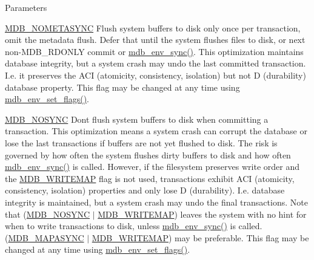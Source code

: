 \begin{DoxyParams}[1]{Parameters}
\begin{DoxyItemize}
\item \mbox{\hyperlink{group__mdb__env_ga5021c4e96ffe9f383f5b8ab2af8e4b16}{M\+D\+B\+\_\+\+N\+O\+M\+E\+T\+A\+S\+Y\+NC}} Flush system buffers to disk only once per transaction, omit the metadata flush. Defer that until the system flushes files to disk, or next non-\/\+M\+D\+B\+\_\+\+R\+D\+O\+N\+LY commit or \mbox{\hyperlink{group__mdb_ga85e61f05aa68b520cc6c3b981dba5037}{mdb\+\_\+env\+\_\+sync()}}. This optimization maintains database integrity, but a system crash may undo the last committed transaction. I.\+e. it preserves the A\+CI (atomicity, consistency, isolation) but not D (durability) database property. This flag may be changed at any time using \mbox{\hyperlink{group__mdb_ga83f66cf02bfd42119451e9468dc58445}{mdb\+\_\+env\+\_\+set\+\_\+flags()}}. 
\item \mbox{\hyperlink{group__mdb__env_ga5791dd1adb09123f82dd1f331209e12e}{M\+D\+B\+\_\+\+N\+O\+S\+Y\+NC}} Don\textquotesingle{}t flush system buffers to disk when committing a transaction. This optimization means a system crash can corrupt the database or lose the last transactions if buffers are not yet flushed to disk. The risk is governed by how often the system flushes dirty buffers to disk and how often \mbox{\hyperlink{group__mdb_ga85e61f05aa68b520cc6c3b981dba5037}{mdb\+\_\+env\+\_\+sync()}} is called. However, if the filesystem preserves write order and the \mbox{\hyperlink{group__mdb__env_ga7b81e9fd5f8fae38786d67e1a8387fa7}{M\+D\+B\+\_\+\+W\+R\+I\+T\+E\+M\+AP}} flag is not used, transactions exhibit A\+CI (atomicity, consistency, isolation) properties and only lose D (durability). I.\+e. database integrity is maintained, but a system crash may undo the final transactions. Note that (\mbox{\hyperlink{group__mdb__env_ga5791dd1adb09123f82dd1f331209e12e}{M\+D\+B\+\_\+\+N\+O\+S\+Y\+NC}} $\vert$ \mbox{\hyperlink{group__mdb__env_ga7b81e9fd5f8fae38786d67e1a8387fa7}{M\+D\+B\+\_\+\+W\+R\+I\+T\+E\+M\+AP}}) leaves the system with no hint for when to write transactions to disk, unless \mbox{\hyperlink{group__mdb_ga85e61f05aa68b520cc6c3b981dba5037}{mdb\+\_\+env\+\_\+sync()}} is called. (\mbox{\hyperlink{group__mdb__env_gab034ed0d8e5938090aef5ee0997f7e94}{M\+D\+B\+\_\+\+M\+A\+P\+A\+S\+Y\+NC}} $\vert$ \mbox{\hyperlink{group__mdb__env_ga7b81e9fd5f8fae38786d67e1a8387fa7}{M\+D\+B\+\_\+\+W\+R\+I\+T\+E\+M\+AP}}) may be preferable. This flag may be changed at any time using \mbox{\hyperlink{group__mdb_ga83f66cf02bfd42119451e9468dc58445}{mdb\+\_\+env\+\_\+set\+\_\+flags()}}. 

\end{DoxyItemize}
\end{DoxyParams}
